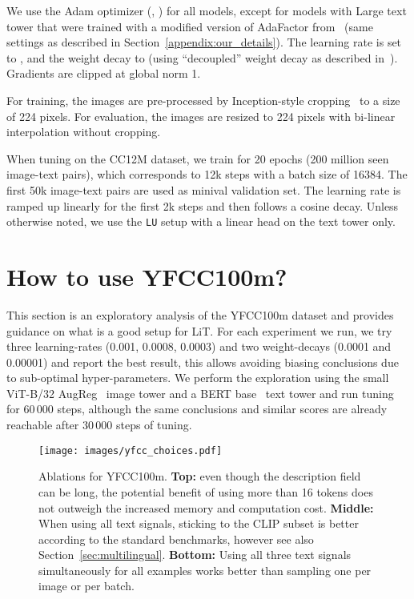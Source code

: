 \documentclass[10pt,twocolumn,letterpaper]{article}
\def \lit {LiT\xspace}
\def \LU {{\tt LU}\xspace}
\begin{document}
We use the Adam optimizer (, ) for all models, except for models with Large text tower that were trained with a modified version of AdaFactor from~\cite{vitg} (same settings as described in Section~\ref{appendix:our_details}).
The learning rate is set to , and the weight decay to  (using “decoupled” weight decay as described in~\cite{decoupled}). Gradients are clipped at global norm 1.

For training, the images are pre-processed by Inception-style cropping~\cite{inception} to a size of 224 pixels. For evaluation, the images are resized to 224 pixels with bi-linear interpolation without cropping.

When tuning on the CC12M dataset, we train for 20 epochs (200 million seen image-text pairs), which corresponds to 12k steps with a batch size of 16384. The first 50k image-text pairs are used as minival validation set.
The learning rate is ramped up linearly for the first 2k steps and then follows a cosine decay.
Unless otherwise noted, we use the \LU setup with a linear head on the text tower only.




\section{How to use YFCC100m?}
\label{appendix:yfcc}

This section is an exploratory analysis of the YFCC100m dataset and provides guidance on what is a good setup for \lit.
For each experiment we run, we try three learning-rates (0.001, 0.0008, 0.0003) and two weight-decays (0.0001 and 0.00001) and report the best result, this allows avoiding biasing conclusions due to sub-optimal hyper-parameters.
We perform the exploration using the small ViT-B/32 AugReg~\cite{augreg} image tower and a BERT base~\cite{bert} text tower and run tuning for 60\,000 steps, although the same conclusions and similar scores are already reachable after 30\,000 steps of tuning.

\begin{figure}[t]
    \centering
    \texttt{[image: images/yfcc\_choices.pdf]}
    \caption{Ablations for YFCC100m.
    \textbf{Top:} even though the description field can be long, the potential benefit of using more than 16 tokens does not outweigh the increased memory and computation cost.
    \textbf{Middle:} When using all text signals, sticking to the CLIP subset is better according to the standard benchmarks, however see also Section~\ref{sec:multilingual}.
    \textbf{Bottom:} Using all three text signals simultaneously for all examples works better than sampling one per image or per batch.}
    \label{fig:yfcc}
\end{figure}
\end{document}
